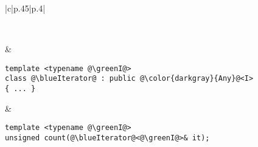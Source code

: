 \begin{frame}[fragile]
\begin{tabular}{|c|p{}|p{}|}
\begin{minipage}{.9\textwidth}
\begin{lstlisting}[escapechar=@]
\end{lstlisting}
\end{minipage}
\\
%
\hline
%
{\small \scoop}
&
\begin{minipage}{.9\textwidth}
\begin{lstlisting}[escapechar=@]
template <typename @\greenI@>
class @\blueIterator@ : public @\color{darkgray}{Any}@<I>
{ ... }
\end{lstlisting}
\end{minipage}
&
\begin{minipage}{.9\textwidth}
\begin{lstlisting}[escapechar=@]
template <typename @\greenI@>
unsigned count(@\blueIterator@<@\greenI@>& it);
\end{lstlisting}
\end{minipage}
\\
%
\hline
%
\end{tabular}


\end{frame}



